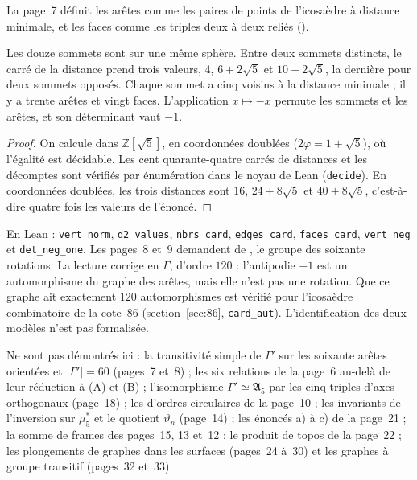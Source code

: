 La page~7 définit les arêtes comme les paires de points de l'icosaèdre à distance minimale, et les faces comme les triples deux à deux reliés ().

\begin{enonce}[Pages 7 et 8]
Les douze sommets sont sur une même sphère. Entre deux sommets distincts, le carré de la distance prend trois valeurs, $4$, $6 + 2\sqrt5$ et $10 + 2\sqrt5$, la dernière pour deux sommets opposés. Chaque sommet a cinq voisins à la distance minimale ; il y a trente arêtes et vingt faces. L'application $x \mapsto -x$ permute les sommets et les arêtes, et son déterminant vaut $-1$.
\end{enonce}

\begin{proof}
On calcule dans $\mathbb Z[\sqrt5]$, en coordonnées doublées ($2\varphi = 1 + \sqrt5$), où l'égalité est décidable. Les cent quarante-quatre carrés de distances et les décomptes sont vérifiés par énumération dans le noyau de Lean (\texttt{decide}). En coordonnées doublées, les trois distances sont $16$, $24 + 8\sqrt5$ et $40 + 8\sqrt5$, c'est-à-dire quatre fois les valeurs de l'énoncé.
\end{proof}

\noindent En Lean : \texttt{vert\_norm}, \texttt{d2\_values}, \texttt{nbrs\_card}, \texttt{edges\_card}, \texttt{faces\_card}, \texttt{vert\_neg} et \texttt{det\_neg\_one}. Les pages~8 et~9 demandent de , le groupe des soixante rotations. La lecture corrige en $\Gamma$, d'ordre $120$ : l'antipodie $-1$ est un automorphisme du graphe des arêtes, mais elle n'est pas une rotation. Que ce graphe ait exactement $120$ automorphismes est vérifié pour l'icosaèdre combinatoire de la cote~86 (section~\ref{sec:86}, \texttt{card\_aut}). L'identification des deux modèles n'est pas formalisée.

Ne sont pas démontrés ici : la transitivité simple de $\Gamma'$ sur les soixante arêtes orientées et $|\Gamma'| = 60$ (pages~7 et~8) ; les six relations de la page~6 au-delà de leur réduction à (A) et (B) ; l'isomorphisme $\Gamma' \simeq \mathfrak A_5$ par les cinq triples d'axes orthogonaux (page~18) ; les  d'ordres circulaires de la page~10 ; les invariants de l'inversion sur $\mu_5^*$ et le quotient $\vartheta_n$ (page~14) ; les énoncés a) à c) de la page~21 ; la somme de frames des pages~15, 13 et~12 ; le produit de topos de la page~22 ; les plongements de graphes dans les surfaces (pages~24 à~30) et les graphes à groupe transitif (pages~32 et~33).
